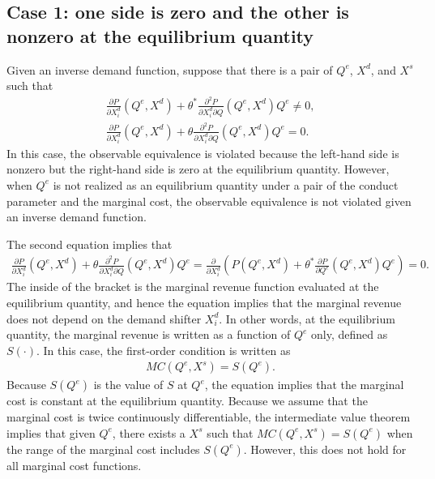 \documentclass[11pt, a4paper]{article}
\theoremstyle{remark}
\begin{document}
\subsection{Case 1: one side is zero and the other is nonzero at the equilibrium quantity}
Given an inverse demand function, suppose that there is a pair of $Q^e$, $X^{d}$, and $X^{s}$ such that 
\begin{align}
    \frac{\partial P}{\partial X^{d}_i}(Q^e, X^{d}) + \theta^{*}\frac{\partial^2 P}{\partial X^{d}_{i}\partial Q}(Q^e, X^{d})Q^e  \ne 0,\\
    \frac{\partial P}{\partial X^{d}_i}(Q^e, X^{d}) + \theta\frac{\partial^2 P}{\partial X^{d}_{i}\partial Q}(Q^e, X^{d})Q^e  = 0.
\end{align}
In this case, the observable equivalence is violated because the left-hand side is nonzero but the right-hand side is zero at the equilibrium quantity.
However, when $Q^e$ is not realized as an equilibrium quantity under a pair of the conduct parameter and the marginal cost, the observable equivalence is not violated given an inverse demand function.

The second equation implies that
\begin{align}
    \frac{\partial P}{\partial X^{d}_i}(Q^e, X^{d}) + \theta\frac{\partial^2 P}{\partial X^{d}_{i}\partial Q}(Q^e, X^{d})Q^e  = \frac{\partial}{\partial X^{d}_i}\left( P(Q^e, X^{d}) + \theta^{*}\frac{\partial P}{\partial Q^e}(Q^e, X^{d})Q^e\right) = 0.
\end{align}
The inside of the bracket is the marginal revenue function evaluated at the equilibrium quantity, and hence the equation implies that the marginal revenue does not depend on the demand shifter $X^{d}_i$.
In other words, at the equilibrium quantity, the marginal revenue is written as a function of $Q^e$ only, defined as $S(\cdot)$.
In this case, the first-order condition is written as
\begin{align}
    MC(Q^e, X^{s}) = S(Q^e).
\end{align}
Because $S(Q^e)$ is the value of $S$ at $Q^e$, the equation implies that the marginal cost is constant at the equilibrium quantity.
Because we assume that the marginal cost is twice continuously differentiable, the intermediate value theorem implies that given $Q^e$, there exists a $X^{s}$ such that $MC(Q^e, X^{s}) = S(Q^e)$ when the range of the marginal cost includes $S(Q^e)$.
However, this does not hold for all marginal cost functions.
\end{document}
